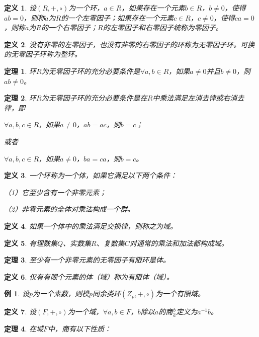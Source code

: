 \documentclass{article}
\newtheorem{Def}{定义}
\newtheorem{Thm}{定理}
\newtheorem*{Example}{例}
\begin{document}
\begin{CJK*}{UTF8}{gbsn}
\begin{Def}
  设$(R,+,\circ)$为一个环，$a\in R$，如果存在一个元素$b\in R$，$b\neq 0$，使得$ab=0$，则称$a$为$R$的一个左零因子；如果存在一个元素$c\in R$，$c\neq 0$，使得$ca=0$，则称$a$为$R$的一个右零因子；$R$的左零因子和右零因子统称为零因子。
\end{Def}

\begin{Def}
  没有非零的左零因子，也没有非零的右零因子的环称为无零因子环。可换的无零因子环称为整环。
\end{Def}

\begin{Thm}
  环$R$为无零因子环的充分必要条件是$\forall a,b \in R$，如果$a\neq 0$并且$b\neq 0$，则$ab\neq 0$。
\end{Thm}

\begin{Thm}
  环$R$为无零因子环的充分必要条件是在$R$中乘法满足左消去律或右消去律，即

  $\forall a,b,c\in R$，如果$a\neq 0$，$ab=ac$，则$b=c$；

  或者

  $\forall a,b,c\in R$，如果$a\neq 0$，$ba=ca$，则$b=c$。

\end{Thm}

\begin{Def}
  一个环称为一个体，如果它满足以下两个条件：

  （1）它至少含有一个非零元素；

  （2）非零元素的全体对乘法构成一个群。
\end{Def}

\begin{Def}
  如果一个体中的乘法满足交换律，则称之为域。
\end{Def}
\begin{Def}
  有理数集$Q$、实数集$R$、复数集$C$对通常的乘法和加法都构成域。
\end{Def}
\begin{Thm}
  至少有一个非零元素的无零因子有限环是体。
\end{Thm}
\begin{Def}
  仅有有限个元素的体（域）称为有限体（域）。
\end{Def}
\begin{Example}
  设$p$为一个素数，则模$p$同余类环$(Z_p,+,\circ)$为一个有限域。
\end{Example}
\begin{Def}
  设$(F,+,\circ)$为一个域，$\forall a,b\in F$，$b$除以$a$的商$\frac{b}{a}$定义为$a^{-1}b$。
\end{Def}
\begin{Thm}
  在域$F$中，商有以下性质：


\end{Thm}
\end{CJK*}
\end{document}
